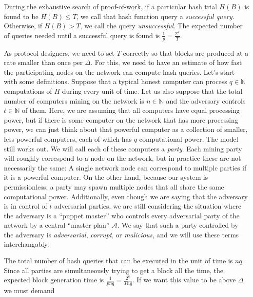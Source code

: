 During the exhaustive search of proof-of-work, if a particular hash trial $H(B)$ is found to be $H(B) \leq T$, we call that hash function query a \emph{successful query}. Otherwise, if $H(B) > T$, we call the query \emph{unsuccessful}. The expected number of queries needed until a successful query is found is $\frac{1}{p} = \frac{2^\kappa}{T}$.

As protocol designers, we need to set $T$ correctly so that blocks are produced at a rate smaller than once per $\Delta$. For this, we need to have an estimate of how fast the participating nodes on the network can compute hash queries. Let's start with some definitions. Suppose that a typical honest computer can process
$q \in \mathbb{N}$
computations of $H$ during every unit of time. Let us also suppose that the total number of computers mining on the network is
$n \in \mathbb{N}$
and the adversary controls
$t \in \mathbb{N}$
of them. Here, we are assuming that all computers have equal processing power, but if there is some computer on the network that has more processing power, we can just think about that powerful computer as a collection of smaller, less powerful computers, each of which has $q$ computational power. The model still works out. We will call each of these computers a
\emph{party}.
Each mining party will roughly correspond to a node on the network, but in practice these are not necessarily the same: A single network node can correspond to multiple parties if it is a powerful computer. On the other hand, because our system is permissionless, a party may spawn multiple nodes that all share the same computational power. Additionally, even though we are saying that the adversary is in control of $t$ adversarial parties, we are still considering the situation where the adversary is a ``puppet master'' who controls every adversarial party of the network by a central ``master plan'' $\mathcal{A}$. We say that such a party controlled by the adversary is \emph{adversarial}, \emph{corrupt}, or \emph{malicious}, and we will use these terms interchangably.

The total number of hash queries that can be executed in the unit of time is $nq$.
Since all parties are simultaneously trying to get a block all the time, the expected block generation
time is $\frac{1}{pnq} = \frac{2^\kappa}{Tnq}$. If we want this value to be above $\Delta$ we must demand

